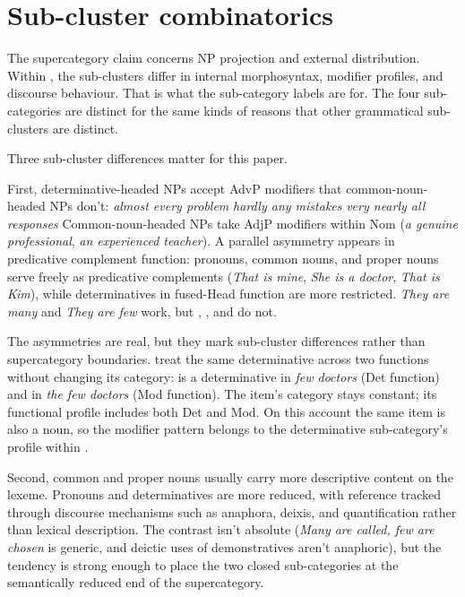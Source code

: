 \documentclass[12pt]{article}
\begin{document}
\section{Sub-cluster combinatorics}\label{sec:subcluster}

The supercategory claim concerns NP projection and external distribution. Within , the sub-clusters differ in internal morphosyntax, modifier profiles, and discourse behaviour. That is what the sub-category labels are for. The four sub-categories are distinct for the same kinds of reasons that other grammatical sub-clusters are distinct.

Three sub-cluster differences matter for this paper.

First, determinative-headed NPs accept AdvP modifiers that common-noun-headed NPs don't:
\ea\label{ex:advp-det}
\ea \textit{almost every problem}
\ex \textit{hardly any mistakes}
\ex \textit{very nearly all responses}
\z
\z
Common-noun-headed NPs take AdjP modifiers within Nom (\textit{a genuine professional}, \textit{an experienced teacher}). A parallel asymmetry appears in predicative complement function: pronouns, common nouns, and proper nouns serve freely as predicative complements (\textit{That is mine}, \textit{She is a doctor}, \textit{That is Kim}), while determinatives in fused-Head function are more restricted. \textit{They are many} and \textit{They are few} work, but , , and  do not.

The asymmetries are real, but they mark sub-cluster differences rather than supercategory boundaries. \textcite[13--14]{payne2010} treat the same determinative across two functions without changing its category:  is a determinative in \textit{few doctors} (Det function) and in \textit{the few doctors} (Mod function). The item's category stays constant; its functional profile includes both Det and Mod. On this account the same item is also a noun, so the modifier pattern belongs to the determinative sub-category's profile within .

Second, common and proper nouns usually carry more descriptive content on the lexeme. Pronouns and determinatives are more reduced, with reference tracked through discourse mechanisms such as anaphora, deixis, and quantification rather than lexical description. The contrast isn't absolute (\textit{Many are called, few are chosen} is generic, and deictic uses of demonstratives aren't anaphoric), but the tendency is strong enough to place the two closed sub-categories at the semantically reduced end of the supercategory.
\end{document}
